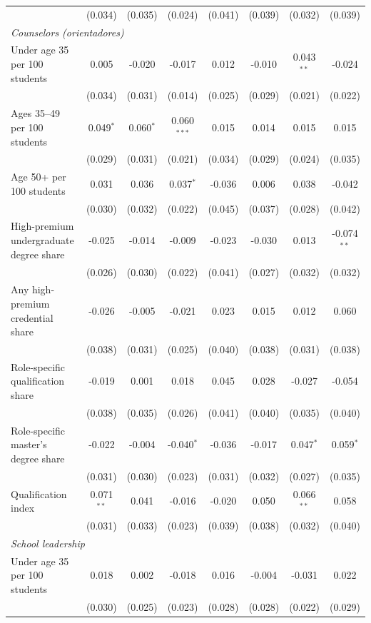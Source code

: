 \begin{table}[!htbp]
{\begin{tabular}{lccccccc}
 & (0.034) & (0.035) & (0.024) & (0.041) & (0.039) & (0.032) & (0.039) \\
\multicolumn{8}{l}{\textit{Counselors (orientadores)}} \\
\quad Under age 35 per 100 students & 0.005 & -0.020 & -0.017 & 0.012 & -0.010 & 0.043$^{**}$ & -0.024 \\
 & (0.034) & (0.031) & (0.014) & (0.025) & (0.029) & (0.021) & (0.022) \\
\quad Ages 35--49 per 100 students & 0.049$^{*}$ & 0.060$^{*}$ & 0.060$^{***}$ & 0.015 & 0.014 & 0.015 & 0.015 \\
 & (0.029) & (0.031) & (0.021) & (0.034) & (0.029) & (0.024) & (0.035) \\
\quad Age 50+ per 100 students & 0.031 & 0.036 & 0.037$^{*}$ & -0.036 & 0.006 & 0.038 & -0.042 \\
 & (0.030) & (0.032) & (0.022) & (0.045) & (0.037) & (0.028) & (0.042) \\
\quad High-premium undergraduate degree share & -0.025 & -0.014 & -0.009 & -0.023 & -0.030 & 0.013 & -0.074$^{**}$ \\
 & (0.026) & (0.030) & (0.022) & (0.041) & (0.027) & (0.032) & (0.032) \\
\quad Any high-premium credential share & -0.026 & -0.005 & -0.021 & 0.023 & 0.015 & 0.012 & 0.060 \\
 & (0.038) & (0.031) & (0.025) & (0.040) & (0.038) & (0.031) & (0.038) \\
\quad Role-specific qualification share & -0.019 & 0.001 & 0.018 & 0.045 & 0.028 & -0.027 & -0.054 \\
 & (0.038) & (0.035) & (0.026) & (0.041) & (0.040) & (0.035) & (0.040) \\
\quad Role-specific master's degree share & -0.022 & -0.004 & -0.040$^{*}$ & -0.036 & -0.017 & 0.047$^{*}$ & 0.059$^{*}$ \\
 & (0.031) & (0.030) & (0.023) & (0.031) & (0.032) & (0.027) & (0.035) \\
\quad Qualification index & 0.071$^{**}$ & 0.041 & -0.016 & -0.020 & 0.050 & 0.066$^{**}$ & 0.058 \\
 & (0.031) & (0.033) & (0.023) & (0.039) & (0.038) & (0.032) & (0.040) \\
\multicolumn{8}{l}{\textit{School leadership}} \\
\quad Under age 35 per 100 students & 0.018 & 0.002 & -0.018 & 0.016 & -0.004 & -0.031 & 0.022 \\
 & (0.030) & (0.025) & (0.023) & (0.028) & (0.028) & (0.022) & (0.029) \\

\end{tabular}}
\end{table}
